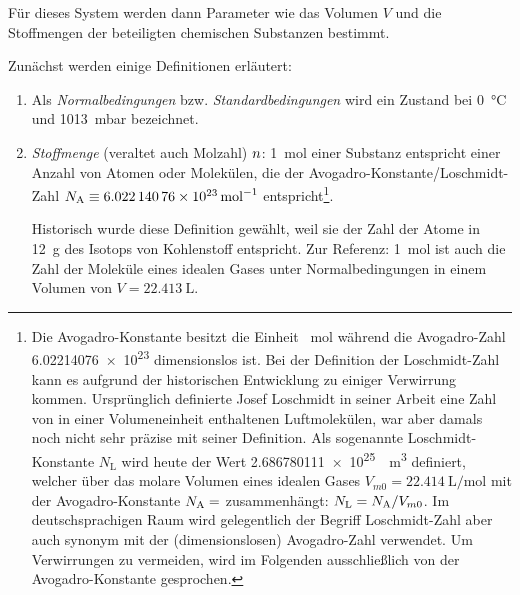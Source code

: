 Für dieses System werden dann Parameter wie das Volumen $V$ und die Stoffmengen der beteiligten chemischen Substanzen bestimmt.

Zunächst werden einige Definitionen erläutert:
\begin{enumerate}
    \item Als \emph{Normalbedingungen} bzw. \emph{Standardbedingungen} wird ein Zustand bei \qty{0}{\degreeCelsius} und \qty{1013}{\milli\bar} bezeichnet.
    \item \emph{Stoffmenge} (veraltet auch Molzahl) $n$: \qty{1}{\mole} einer Substanz entspricht einer Anzahl von Atomen oder Molekülen, die der Avogadro-Konstante/Loschmidt-Zahl $N_\mathrm{A} \equiv \qty{6,02214076e23}{\per\mole}$ entspricht\footnote{
          Die Avogadro-Konstante besitzt die Einheit \si{\per\mole} während die Avogadro-Zahl \num{6,02214076e23} dimensionslos ist.
          Bei der Definition der Loschmidt-Zahl kann es aufgrund der historischen Entwicklung zu einiger Verwirrung kommen. Ursprünglich definierte Josef Loschmidt in seiner Arbeit  eine Zahl von in einer Volumeneinheit enthaltenen Luftmolekülen, war aber damals noch nicht sehr präzise mit seiner Definition. Als sogenannte Loschmidt-Konstante $N_\mathrm{L}$ wird heute der Wert \qty{2.686780111e25}{\per\cubic\m} definiert, welcher über das molare Volumen eines idealen Gases $V_{m0} = \qty{22,414}{\liter\per\mole}$ mit der Avogadro-Konstante $N_\mathrm{A}=$ zusammenhängt: $N_\mathrm{L}=N_\mathrm{A}/V_{m0}$. \cite{lit:loschmidt_constant,lit:loschmidt}
          Im deutschsprachigen Raum wird gelegentlich der Begriff Loschmidt-Zahl aber auch synonym mit der (dimensionslosen) Avogadro-Zahl verwendet. Um Verwirrungen zu vermeiden, wird im Folgenden ausschließlich von der Avogadro-Konstante gesprochen.}.

          Historisch wurde diese Definition gewählt, weil sie der Zahl der Atome in \qty{12}{\g} des Isotops  von Kohlenstoff entspricht.
          Zur Referenz: \qty{1}{\mole} ist auch die Zahl der Moleküle eines idealen Gases unter Normalbedingungen in einem Volumen von $V=\qty{22,413}{\liter}$.


\end{enumerate}
